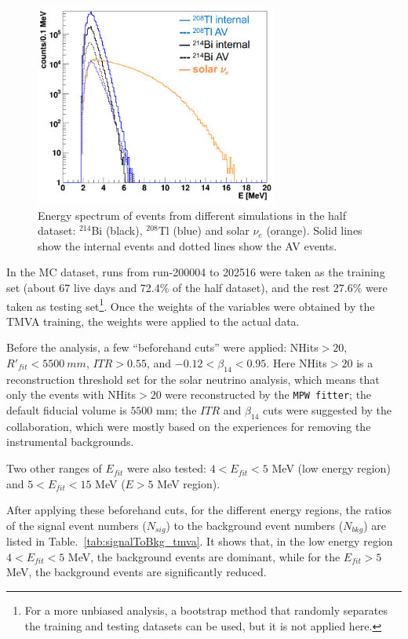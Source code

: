 \begin{figure}[!htb]
	\centering
	\includegraphics[width=8cm]{TMVA_bkgs_1.png}
	\caption[Energy spectrum of events from different simulations.]{Energy spectrum of events from different simulations in the half dataset: $^{214}$Bi (black), $^{208}$Tl (blue) and solar $\nu_e$ (orange). Solid lines show the internal events and dotted lines show the AV events.}
	\label{TMVA_bkgs_1}
\end{figure}

In the MC dataset, runs from run-200004 to 202516 were taken as the training set (about 67 live days and 72.4\% of the half dataset), and the rest 27.6\% were taken as testing set\footnote{For a more unbiased analysis, a bootstrap method\cite{murphy2012machine} that randomly separates the training and testing datasets can be used, but it is not applied here.}. Once the weights of the variables were obtained by the TMVA training, the weights were applied to the actual data.

Before the analysis, a few ``beforehand cuts'' were applied: NHits$>20$, $R'_{fit}<5500~mm$, $ITR>0.55$, and $-0.12<\beta_{14}<0.95$. Here NHits$>20$ is a reconstruction threshold set for the solar neutrino analysis, which means that only the events with NHits$>20$ were reconstructed by the \texttt{MPW fitter}; the default fiducial volume is $5500$ mm; the $ITR$ and $\beta_{14}$ cuts were suggested by the collaboration, which were mostly based on the experiences for removing the instrumental backgrounds\cite{waterunidoc}. 

Two other ranges of $E_{fit}$ were also tested: $4<E_{fit}<5$ MeV (low energy region) and $5<E_{fit}<15$ MeV ($E>5$ MeV region). 

After applying these beforehand cuts, for the different energy regions, the ratios of the signal event numbers ($N_{sig}$) to the background event numbers ($N_{bkg}$) are listed in Table.~\ref{tab:signalToBkg_tmva}. It shows that, in the low energy region $4<E_{fit}<5$ MeV, the background events are dominant, while for the $E_{fit}>5$ MeV, the background events are significantly reduced.

